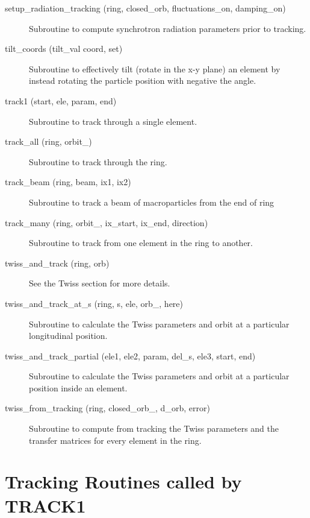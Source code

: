 \begin{description}
\item[setup\_radiation\_tracking (ring, closed\_orb, fluctuations\_on, damping\_on)] \Newline
Subroutine to compute synchrotron radiation parameters prior to tracking. 

\item[tilt\_coords (tilt\_val coord, set)] \Newline
Subroutine to effectively tilt (rotate in the x-y plane) an element by 
instead rotating the particle position with negative the angle. 

\item[track1 (start, ele, param, end)] \Newline
Subroutine to track through a single element. 

\item[track\_all (ring, orbit\_)] \Newline
Subroutine to track through the ring. 

\item[track\_beam (ring, beam, ix1, ix2)] \Newline 
     Subroutine to track a beam of macroparticles from the end of
     ring%

\item[track\_many (ring, orbit\_, ix\_start, ix\_end, direction)] \Newline
Subroutine to track from one element in the ring to another. 

\item[twiss\_and\_track (ring, orb)] \Newline
See the Twiss section for more details. 

\item[twiss\_and\_track\_at\_s (ring, s, ele, orb\_, here)] \Newline
Subroutine to calculate the Twiss parameters and orbit at a particular longitudinal position. 

\item[twiss\_and\_track\_partial (ele1, ele2, param, del\_s, ele3, start, end)] \Newline
Subroutine to calculate the Twiss parameters and orbit at a particular position inside an element. 

\item[twiss\_from\_tracking (ring, closed\_orb\_, d\_orb, error)] \Newline
Subroutine to compute from tracking the Twiss parameters and the transfer matrices 
for every element in the ring. 

\end{description}

\section{Tracking Routines called by TRACK1}
\label{r:track1}   

